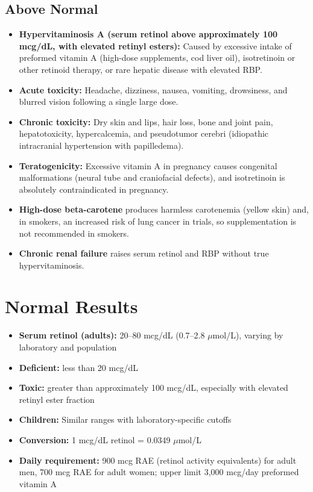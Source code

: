 \subsection*{Above Normal}
\begin{itemize}
  \item \textbf{Hypervitaminosis A (serum retinol above approximately 100 mcg/dL, with elevated retinyl esters):} Caused by excessive intake of preformed vitamin A (high-dose supplements, cod liver oil), isotretinoin or other retinoid therapy, or rare hepatic disease with elevated RBP.
  \item \textbf{Acute toxicity:} Headache, dizziness, nausea, vomiting, drowsiness, and blurred vision following a single large dose.
  \item \textbf{Chronic toxicity:} Dry skin and lips, hair loss, bone and joint pain, hepatotoxicity, hypercalcemia, and pseudotumor cerebri (idiopathic intracranial hypertension with papilledema).
  \item \textbf{Teratogenicity:} Excessive vitamin A in pregnancy causes congenital malformations (neural tube and craniofacial defects), and isotretinoin is absolutely contraindicated in pregnancy.
  \item \textbf{High-dose beta-carotene} produces harmless carotenemia (yellow skin) and, in smokers, an increased risk of lung cancer in trials, so supplementation is not recommended in smokers.
  \item \textbf{Chronic renal failure} raises serum retinol and RBP without true hypervitaminosis.
\end{itemize}

\section*{Normal Results}
\begin{itemize}
  \item \textbf{Serum retinol (adults):} 20--80 mcg/dL (0.7--2.8 $\mu$mol/L), varying by laboratory and population
  \item \textbf{Deficient:} less than 20 mcg/dL
  \item \textbf{Toxic:} greater than approximately 100 mcg/dL, especially with elevated retinyl ester fraction
  \item \textbf{Children:} Similar ranges with laboratory-specific cutoffs
  \item \textbf{Conversion:} 1 mcg/dL retinol = 0.0349 $\mu$mol/L
  \item \textbf{Daily requirement:} 900 mcg RAE (retinol activity equivalents) for adult men, 700 mcg RAE for adult women; upper limit 3,000 mcg/day preformed vitamin A
\end{itemize}

